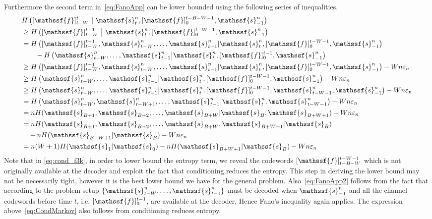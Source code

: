 \documentclass[journal, twocolumn, 10pt]{IEEEtran}
\newcommand{\eps}{\varepsilon}
\newcommand{\rvf}{{\mathssf{f}}}    %
\newcommand{\rvs}{{\mathssf{s}}}    %
\begin{document}
Furthermore the second term in~\eqref{eq:FanoApp} can be lower bounded using the following series of inequalities.
\begin{align}
&H\left([\rvf]_{t-W}^{t}~|~\rvs_t^n,[\rvf]_{0}^{t-B-W-1},\rvs_{-1}^n\right) \notag\\
&\ge H\left([\rvf]_{t-W}^{t-1}~\big|~\rvs_{t}^n,[\rvf]_{0}^{t-W-1},\rvs_{-1}^n\right) \label{eq:cond_f3k}\\
&= H\left([\rvf]_{t-W}^{t-1}, \rvs^n_{t-W}, \ldots,\rvs_{t-1}^n |\rvs_{t}^n,[\rvf]_{0}^{t-W-1},\rvs_{-1}^n\right) \notag\\
&\qquad - H\left(\rvs_{t-W}^n, \ldots,\rvs_{t-1}^n\big|\rvs_{t}^n,[\rvf]_{0}^{t-1},\rvs_{-1}^n\right)\notag\\
&\ge H\left([\rvf]_{t-W}^{t-1}, \rvs_{t-W}^n,  \ldots,\rvs_{t-1}^n |\rvs_{t}^n,[\rvf]_{0}^{t-W-1},\rvs_{-1}^n\right) - Wn\eps_n \label{eq:FanoApp2}\\
&\ge H\left(\rvs_{t-W}^n, \ldots,\rvs_{t-1}^n\big|\rvs_{t}^n,[\rvf]_{0}^{t-W-1},\rvs_{-1}^n\right)- Wn\eps_n \notag\\
&\ge H\left(\rvs_{t-W}^n, \ldots,\rvs_{t-1}^n\big|\rvs_{t}^n,[\rvf]_{0}^{t-W-1}, \rvs_{t-W-1}^n,\rvs_{-1}^n\right) - Wn\eps_n \notag\\
& = H\left(\rvs_{t-W}^n, \rvs_{t-W+1}^n, \ldots,\rvs_{t-1}^n\big|\rvs_{t}^n, \rvs_{t-W-1}^n \right) - Wn\eps_n\label{eq:CondMarkov}\\
&= n H(\rvs_{B+1},\rvs_{B+2},\ldots,\rvs_{B+W}|\rvs_B,\rvs_{B+W+1})- Wn\eps_n\label{eq:Aux7}\\
&= n H(\rvs_{B+1}, \rvs_{B+2}, \ldots, \rvs_{B+W},\rvs_{B+W+1} |\rvs_B) \notag\\ &\quad - n H(\rvs_{B+W+1} |\rvs_B) - Wn\eps_n\notag\\
&= n (W+1)H(\rvs_1 |\rvs_0)- n H(\rvs_{B+W+1} |\rvs_B) - Wn\eps_n \label{eq:term2}
\end{align}
Note that in \eqref{eq:cond_f3k}, in order to lower bound the entropy term, we reveal the codewords $[\rvf]_{t-B-W}^{t-W-1}$ which is not originally available at the decoder and exploit the fact that conditioning reduces the entropy. This step in deriving the lower bound may not be necessarily tight, however it is the best lower bound we have for the general problem. Also~\eqref{eq:FanoApp2} follows from the fact that according to the problem setup $\{\rvs_{t-W}^n, \ldots,\rvs_{t-1}^n\}$ must be decoded when $\rvs_{-1}^n$ and all the channel codewords before time $t$, i.e. $[\rvf]_0^{t-1}$,  are available at the decoder, Hence Fano's inequality again applies. The expression above~\eqref{eq:CondMarkov} also follows from conditioning reduces entropy.
\end{document}

